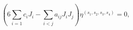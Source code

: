 \begin{equation}
\label{timecomp1}
\left( 6 \sum_{i=1} c_i J_i - \sum_{i<j} a_{ij} J_i J_j \right) 
\eta^{(s_1,s_2,s_3,s_4)} = 0,
\end{equation}

